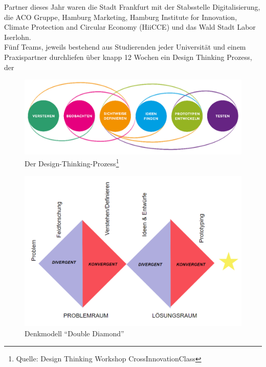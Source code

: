     Partner dieses Jahr waren die Stadt Frankfurt mit der Stabsstelle Digitalisierung, die ACO Gruppe, Hamburg Marketing, Hamburg Institute for Innovation, Climate Protection and Circular Economy (HiiCCE) und das Wald Stadt Labor Iserlohn. \\

    Fünf Teams, jeweils bestehend aus Studierenden jeder Universität und einem Praxispartner durchliefen über knapp 12 Wochen ein Design Thinking Prozess, der 

    \begin{figure}[h]
        \begin{center}
            \includegraphics[width=12cm]{sketches/design_thinking_2.png}
        \end{center}
        \caption{Der Design-Thinking-Prozess\protect\footnote{Quelle: Design Thinking Workshop CrossInnovationClass}}
        \label{fig:dt_2}
    \end{figure}

    \begin{figure}[h]
        \begin{center}
            \includegraphics[width=12cm]{sketches/design_thinking_1.png}
        \end{center}
        \caption{Denkmodell \enquote{Double Diamond}\protect\footnotemark[\value{footnote}]}
        \label{fig:dt_1}
    \end{figure}
    

